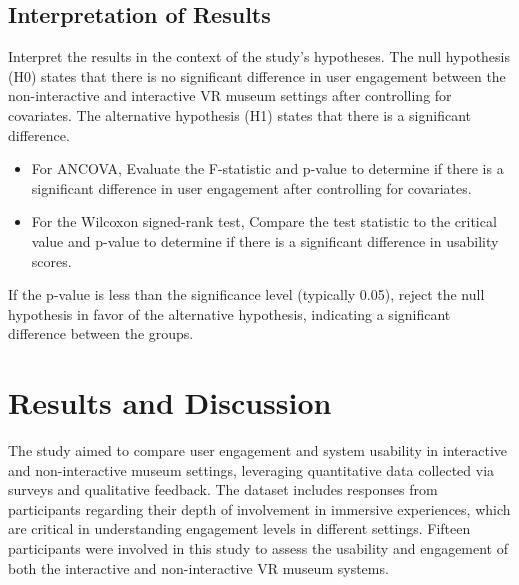\documentclass[conference]{IEEEtran}
\begin{document}
\subsection{Interpretation of Results} 
Interpret the results in the context of the study's hypotheses. The null hypothesis (H0) states that there is no significant difference in user engagement between the non-interactive and interactive VR museum settings after controlling for covariates. The alternative hypothesis (H1) states that there is a significant difference.

\begin{itemize}
    \item For ANCOVA, Evaluate the F-statistic and p-value to determine if there is a significant difference in user engagement after controlling for covariates.
\item For the Wilcoxon signed-rank test, Compare the test statistic to the critical value and p-value to determine if there is a significant difference in usability scores.
\end{itemize}
If the p-value is less than the significance level (typically 0.05), reject the null hypothesis in favor of the alternative hypothesis, indicating a significant difference between the groups.


\section{Results and Discussion}

The study aimed to compare user engagement and system usability in interactive and non-interactive museum settings, leveraging quantitative data collected via surveys and qualitative feedback. The dataset includes responses from participants regarding their depth of involvement in immersive experiences, which are critical in understanding engagement levels in different settings. Fifteen participants were involved in this study to assess the usability and engagement of both the interactive and non-interactive VR museum systems.
\end{document}
